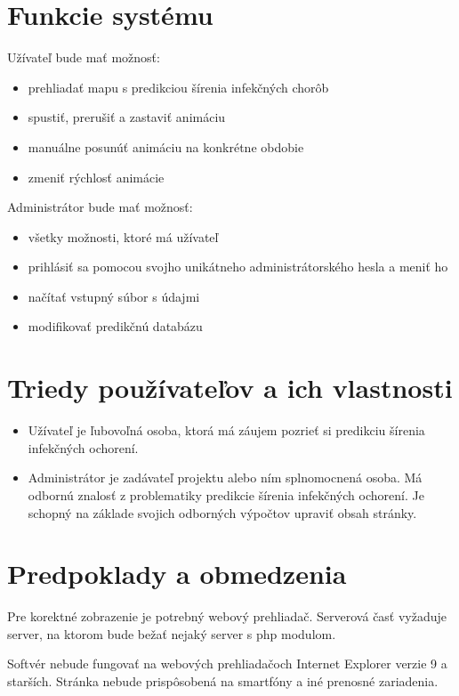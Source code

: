 \documentclass[12pt,a4paper]{report}
\begin{document}
\section[Funkcie systému]{\rmfamily\bfseries
	Funkcie systému}
Užívateľ bude mať možnosť:
\begin{itemize}
	\item prehliadať mapu s predikciou šírenia infekčných chorôb	
	\item spustiť, prerušiť a zastaviť animáciu
	\item manuálne posunúť animáciu na konkrétne obdobie
	\item zmeniť rýchlosť animácie
\end{itemize}
Administrátor bude mať možnosť:
\begin{itemize}
	\item všetky možnosti, ktoré má užívateľ 
	\item prihlásiť sa pomocou svojho unikátneho administrátorského hesla a meniť ho
	\item načítať vstupný súbor s údajmi
	\item modifikovať predikčnú databázu
\end{itemize}

\section[Triedy používateľov a ich vlastnosti]{\rmfamily\bfseries
	Triedy používateľov a ich vlastnosti}
\begin{itemize}
	\item Užívateľ je ľubovoľná osoba, ktorá má záujem pozrieť si predikciu šírenia infekčných ochorení.
	\item Administrátor je zadávateľ projektu alebo ním splnomocnená osoba. Má odbornú znalosť z problematiky predikcie šírenia infekčných ochorení. Je schopný
	na základe svojich odborných výpočtov upraviť obsah stránky.
\end{itemize}

\section[Predpoklady a obmedzenia]{\rmfamily\bfseries
	Predpoklady a obmedzenia}
Pre korektné zobrazenie je potrebný webový prehliadač. Serverová časť vyžaduje server, na ktorom bude bežať nejaký server s php modulom.\par
Softvér nebude fungovať na webových prehliadačoch Internet Explorer verzie 9 a starších. Stránka nebude prispôsobená na smartfóny a iné prenosné zariadenia. 
\end{document}
